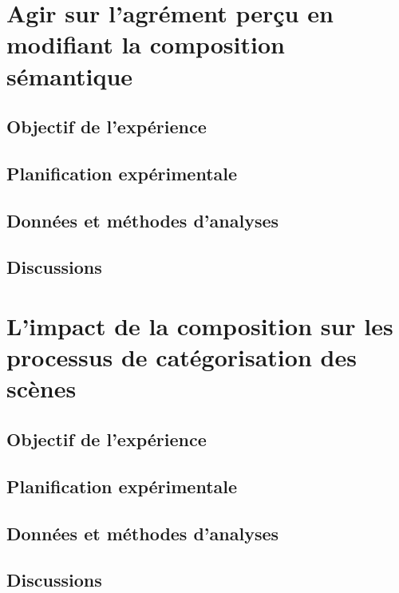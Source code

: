 \section{Agir sur l'agrément perçu en modifiant la composition sémantique}
\label{sec:xp3}

\subsection{Objectif de l'expérience}

\subsection{Planification expérimentale}

\subsection{Données et méthodes d'analyses}

\subsection{Discussions}

\section{L'impact de la composition sur les processus de catégorisation des scènes}
\label{sec:xp4}

\subsection{Objectif de l'expérience}

\subsection{Planification expérimentale}

\subsection{Données et méthodes d'analyses}

\subsection{Discussions}




